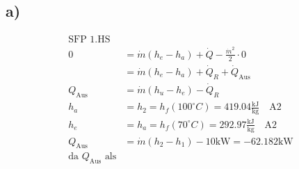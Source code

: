 

\subsection*{a)}
\begin{align*}
\text{SFP 1.HS} \\
0 &= \dot{m} (h_e - h_a) + \dot{Q} - \frac{\dot{m}^2}{2} \cdot 0 \\
&= \dot{m} (h_e - h_a) + \dot{Q}_R + \dot{Q}_{\text{Aus}} \\
Q_{\text{Aus}} &= \dot{m} (h_u - h_e) - \dot{Q}_R \\
h_a &= h_2 = h_f (100^\circ C) = 419.04 \frac{\text{kJ}}{\text{kg}} \quad \text{A2} \\
h_e &= h_a = h_f (70^\circ C) = 292.97 \frac{\text{kJ}}{\text{kg}} \quad \text{A2} \\
Q_{\text{Aus}} &= \dot{m} (h_2 - h_1) - 10 \text{kW} = -62.182 \text{kW} \\
\text{da } Q_{\text{Aus}} \text{ als}
\end{align*}